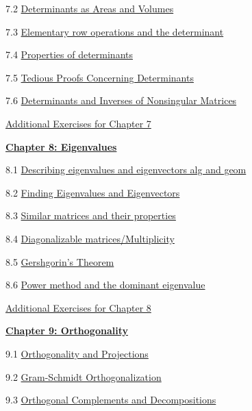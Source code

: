 \documentclass{ximera}
\begin{document}
7.2	\href{https://ximera.osu.edu/oerlinalg/LinearAlgebra/DET-0070/main}{Determinants as Areas and Volumes}
	
7.3	\href{https://ximera.osu.edu/oerlinalg/LinearAlgebra/DET-0030/main}{Elementary row operations and the determinant}
	
7.4	\href{https://ximera.osu.edu/oerlinalg/LinearAlgebra/DET-0040/main}{Properties of determinants}
	
7.5	\href{https://ximera.osu.edu/oerlinalg/LinearAlgebra/DET-0050/main}{Tedious Proofs Concerning Determinants}
	
7.6	\href{https://ximera.osu.edu/oerlinalg/LinearAlgebra/DET-0060/main}{Determinants and Inverses of Nonsingular Matrices}
	
\href{https://ximera.osu.edu/oerlinalg/LinearAlgebra/SUPX-0070/main}{Additional Exercises for Chapter 7}
	
\href{https://ximera.osu.edu/oerlinalg/LinearAlgebra/XLAChapter_eigenvalues/main}{\textbf{Chapter 8: Eigenvalues}}
	
8.1	\href{https://ximera.osu.edu/oerlinalg/LinearAlgebra/EIG-0010/main}{Describing eigenvalues and eigenvectors alg and geom}
	
8.2	\href{https://ximera.osu.edu/oerlinalg/LinearAlgebra/EIG-0020/main}{Finding Eigenvalues and Eigenvectors}
	
8.3	\href{https://ximera.osu.edu/oerlinalg/LinearAlgebra/EIG-0040/main}{Similar matrices and their properties}
	
8.4	\href{https://ximera.osu.edu/oerlinalg/LinearAlgebra/EIG-0050/main}{Diagonalizable matrices/Multiplicity}
	
8.5	\href{https://ximera.osu.edu/oerlinalg/LinearAlgebra/EIG-0080/main}{Gershgorin's Theorem}
	
8.6	\href{https://ximera.osu.edu/oerlinalg/LinearAlgebra/EIG-0070/main}{Power method and the dominant eigenvalue}
	
\href{https://ximera.osu.edu/oerlinalg/LinearAlgebra/SUPX-0080/main}{Additional Exercises for Chapter 8}
	
\href{https://ximera.osu.edu/oerlinalg/LinearAlgebra/XLAChapter_orthogonality/main}{\textbf{Chapter 9: Orthogonality}}
	
9.1	\href{https://ximera.osu.edu/oerlinalg/LinearAlgebra/RTH-0010/main}{Orthogonality and Projections}
	
9.2	\href{https://ximera.osu.edu/oerlinalg/LinearAlgebra/RTH-0015/main}{Gram-Schmidt Orthogonalization}
	
9.3	\href{https://ximera.osu.edu/oerlinalg/LinearAlgebra/RTH-0020/main}{Orthogonal Complements and Decompositions}
	
\end{document}
